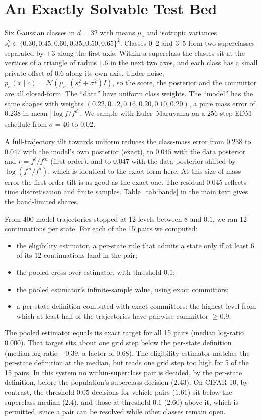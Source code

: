 \section{An Exactly Solvable Test Bed}
\label{app:testbed}

Six Gaussian classes in $d=32$ with means $\mu_c$ and isotropic variances $s_c^2\in\{0.30,0.45,0.60,0.35,0.50,0.65\}^2$. Classes 0--2 and 3--5 form two superclasses separated by $\pm3$ along the first axis. Within a superclass the classes sit at the vertices of a triangle of radius $1.6$ in the next two axes, and each class has a small private offset of $0.6$ along its own axis. Under noise, $p_\sigma(x\mid c)=\mathcal N(\mu_c,(s_c^2+\sigma^2)I)$, so the score, the posterior and the committor are all closed-form. The ``data'' have uniform class weights. The ``model'' has the same shapes with weights $(0.22,0.12,0.16,0.20,0.10,0.20)$, a pure mass error of $0.238$ in mean $|\log f/f^d|$. We sample with Euler--Maruyama on a 256-step EDM schedule from $\sigma=40$ to $0.02$.

A full-trajectory tilt towards uniform reduces the class-mass error from $0.238$ to $0.047$ with the model's own posterior (exact), to $0.045$ with the data posterior and $r=f^t/f^m$ (first order), and to $0.047$ with the data posterior shifted by $\log(f^m/f^d)$, which is identical to the exact form here. At this size of mass error the first-order tilt is as good as the exact one. The residual $0.045$ reflects time discretisation and finite samples. Table~\ref{tab:bands} in the main text gives the band-limited shares.

From 400 model trajectories stopped at 12 levels between 8 and $0.1$, we ran 12 continuations per state. For each of the 15 pairs we computed:
\begin{itemize}[leftmargin=*]
\item the eligibility estimator, a per-state rule that admits a state only if at least 6 of its 12 continuations land in the pair;
\item the pooled cross-over estimator, with threshold $0.1$;
\item the pooled estimator's infinite-sample value, using exact committors;
\item a per-state definition computed with exact committors: the highest level from which at least half of the trajectories have pairwise committor $\ge0.9$.
\end{itemize}
The pooled estimator equals its exact target for all 15 pairs (median log-ratio $0.000$). That target sits about one grid step below the per-state definition (median log-ratio $-0.39$, a factor of $0.68$). The eligibility estimator matches the per-state definition at the median, but reads one grid step too high for 5 of the 15 pairs. In this system no within-superclass pair is decided, by the per-state definition, before the population's superclass decision ($2.43$). On CIFAR-10, by contrast, the threshold-$0.05$ decisions for vehicle pairs ($1.61$) sit below the superclass median ($2.4$), and those at threshold $0.1$ ($2.60$) above it, which is permitted, since a pair can be resolved while other classes remain open.

